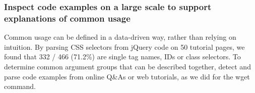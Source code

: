 \begin{changes}
\subsubsection{Inspect code examples on a large scale to support explanations of common usage}
Common usage can be defined in a data-driven way, rather than relying on intuition.
By parsing CSS selectors from jQuery code on 50 tutorial pages, we found that 332 / 466 (71.2\%) are single tag names, IDs or class selectors.
To determine common argument groups that can be described together, detect and parse code examples from online Q\&As or web tutorials, as we did for the wget command.

\end{changes}
